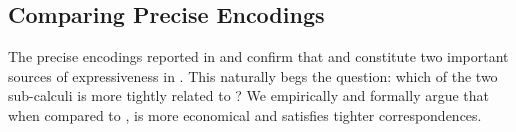 \documentclass[runningheads]{llncs}
\begin{document}
{%
%


%

\subsection{Comparing Precise Encodings}\label{ss:compare}
The precise encodings reported in   and 
confirm that \HO and \sessp constitute two important sources of expressiveness in \HOp.
This naturally begs the question: which of the two sub-calculi is more tightly related to \HOp?
We empirically and formally argue that when compared to \sessp, \HO   is more economical and satisfies tighter correspondences.

}
\end{document}
